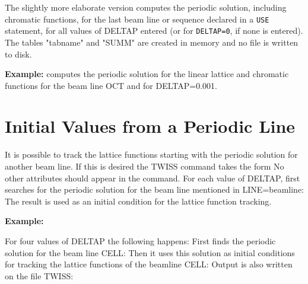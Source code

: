 The slightly more elaborate version 
computes the periodic solution, including chromatic functions, for the last beam
line or sequence declared in a \texttt{USE} statement, for all values of
DELTAP entered (or for \texttt{DELTAP=0}, if none is entered). 
The tables "tabname" and "SUMM" are created in memory and no file is
written to disk. 

\textbf{Example:} 
computes the periodic solution for the linear lattice and
chromatic functions for the beam line OCT and for DELTAP=0.001. 


\section{Initial Values from a Periodic Line}
\label{sec:twissinitial}

It is possible to track the lattice functions starting with the periodic
solution for another beam line. If this is desired the TWISS command
takes the form  
No other attributes should appear in the command. For each value of
DELTAP, \madx first searches for the periodic solution for the beam line
mentioned in LINE=beamline: The result is used as an initial condition
for the lattice function tracking. 

\textbf{Example:} 

For four values of DELTAP the following happens: First \madx finds the
periodic solution for the beam line CELL: Then it uses this solution as
initial conditions for tracking the lattice functions of the beamline
CELL: Output is also written on the file TWISS:  

